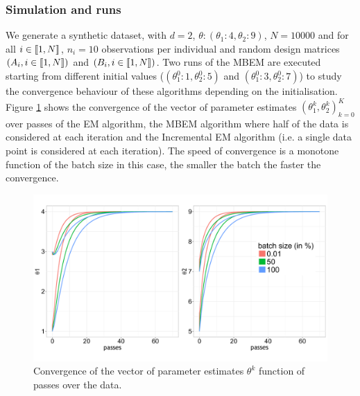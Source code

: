 \subsubsection{Simulation and runs}
We generate a synthetic dataset, with $d = 2$, $\theta: (\theta_1:4,\theta_2:9)$, $N=10000$ and for all $i \in \llbracket1,N\rrbracket$, $n_i = 10$ observations per individual and random design matrices $(A_i, i \in \llbracket1,N\rrbracket)$ and $(B_i, i \in \llbracket1,N\rrbracket)$. Two runs of the MBEM are executed starting from different initial values ($(\theta_1^0:1,\theta_2^0:5)$ and $(\theta_1^0:3,\theta_2^0:7)$) to study the convergence behaviour of these algorithms depending on the initialisation.
Figure \ref{iem_glm} shows the convergence of the vector of parameter estimates $(\theta_1^k,\theta_2^k)_{k=0}^{K}$ over passes of the EM algorithm, the MBEM algorithm where half of the data is considered at each iteration and the Incremental EM algorithm (i.e. a single data point is considered at each iteration). The speed of convergence is a monotone function of the batch size in this case, the smaller the batch the faster the convergence.
\begin{figure}
\begin{center}
\includegraphics[scale = 0.35]{pics/iems.pdf}
\caption{Convergence of the vector of parameter estimates $\theta^k$ function of passes over the data.}
\label{iem_glm}
\end{center}
\end{figure}



